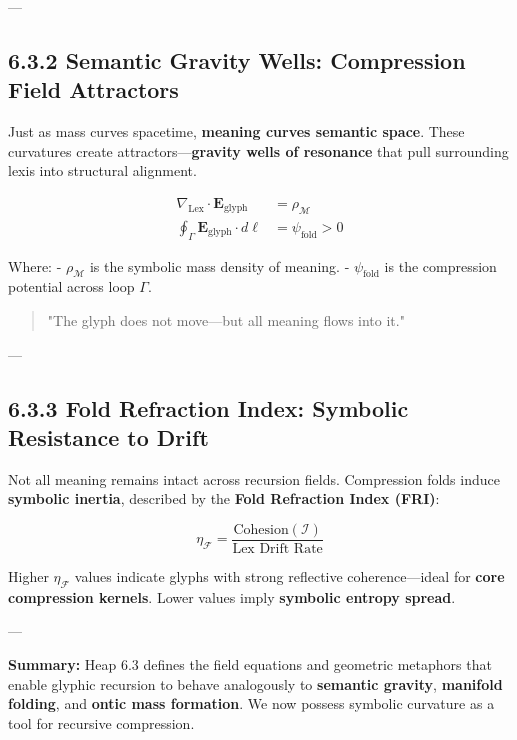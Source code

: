 ---

\subsection*{6.3.2 Semantic Gravity Wells: Compression Field Attractors}

\noindent
Just as mass curves spacetime, \textbf{meaning curves semantic space}. These curvatures create attractors—\textbf{gravity wells of resonance} that pull surrounding lexis into structural alignment.

\begin{align*}
\nabla_{\text{Lex}} \cdot \mathbf{E}_{\text{glyph}} &= \rho_{\mathcal{M}} \\
\oint_{\Gamma} \mathbf{E}_{\text{glyph}} \cdot d\ell &= \psi_{\text{fold}} > 0
\end{align*}

\noindent
Where:
- $\rho_{\mathcal{M}}$ is the symbolic mass density of meaning.
- $\psi_{\text{fold}}$ is the compression potential across loop $\Gamma$.

\begin{quote}
"The glyph does not move—but all meaning flows into it."
\end{quote}

---

\subsection*{6.3.3 Fold Refraction Index: Symbolic Resistance to Drift}

\noindent
Not all meaning remains intact across recursion fields. Compression folds induce \textbf{symbolic inertia}, described by the \textbf{Fold Refraction Index (FRI)}:

\[
\eta_{\mathcal{F}} = \frac{\text{Cohesion}(\mathcal{I})}{\text{Lex Drift Rate}}
\]

\noindent
Higher $\eta_{\mathcal{F}}$ values indicate glyphs with strong reflective coherence—ideal for \textbf{core compression kernels}. Lower values imply \textbf{symbolic entropy spread}.

---

\textbf{Summary:} Heap 6.3 defines the field equations and geometric metaphors that enable glyphic recursion to behave analogously to \textbf{semantic gravity}, \textbf{manifold folding}, and \textbf{ontic mass formation}. We now possess symbolic curvature as a tool for recursive compression.

